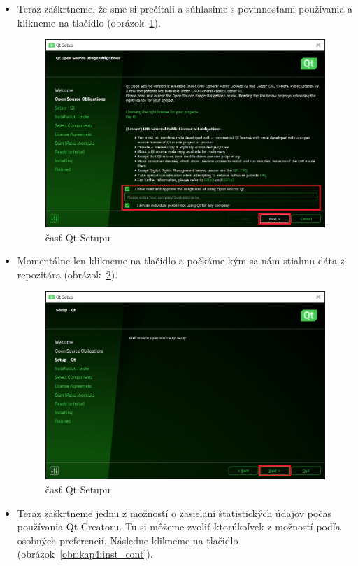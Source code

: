 \begin{itemize}
\item Teraz zaškrtneme, že sme si prečítali a súhlasíme s povinnosťami používania  a klikneme na tlačidlo  (obrázok~\ref{obr:kap4:inst_oblg}).

\begin{figure}[!htb]
	\centering
	\includegraphics[width=12cm]{img/kap04_inst_oblg}
	\caption{ časť Qt Setupu}
	\label{obr:kap4:inst_oblg}
\end{figure}

\item Momentálne len klikneme na tlačidlo  a počkáme kým sa nám stiahnu dáta z repozitára (obrázok~\ref{obr:kap4:inst_set}).

\begin{figure}[!htb]
	\centering
	\includegraphics[width=12cm]{img/kap04_inst_set}
	\caption{ časť Qt Setupu}
	\label{obr:kap4:inst_set}
\end{figure}

\item Teraz zaškrtneme jednu z možností o zasielaní štatistických údajov počas používania Qt Creatoru. Tu si môžeme zvoliť ktorúkoľvek z možností podľa osobných preferencií. Následne klikneme na tlačidlo  (obrázok~\ref{obr:kap4:inst_cont}).


\end{itemize}
